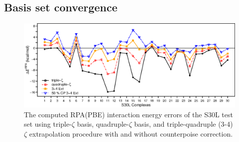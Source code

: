 \documentclass[twoside,twocolumn,9pt]{article}
\begin{document}
 \subsection{Basis set convergence}

\begin{figure}[h]
  \centering
  \includegraphics[scale=0.22]{conv_v5}
  \caption{The computed RPA(PBE) interaction energy errors of the
    S30L test set using triple-$\zeta$ basis, quadruple-$\zeta$ basis,
    and triple-quadruple (3-4) $\zeta$ extrapolation procedure with and
    without counterpoise correction.}
  \label{fig:conv}
\end{figure}
\end{document}

